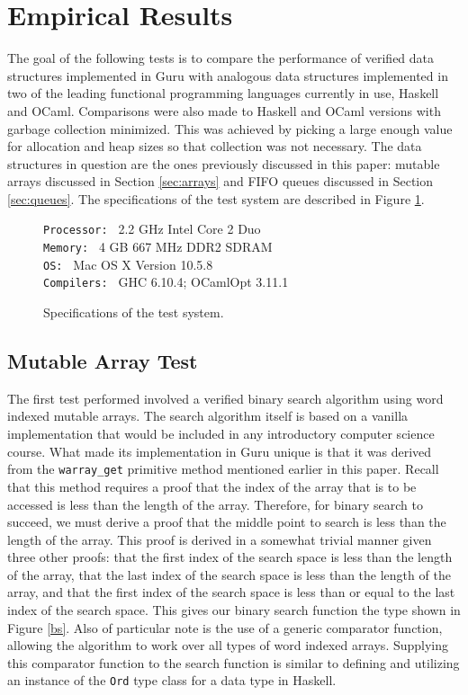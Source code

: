 \documentclass[9pt,natbib]{sigplanconf}
\begin{document}
\section{Empirical Results}
\label{sec:emp}

The goal of the following tests is to compare the performance of verified data structures implemented in Guru with analogous data structures implemented in two of the leading functional programming languages currently in use, Haskell and OCaml.  Comparisons were also made to Haskell and OCaml versions with garbage collection minimized.  This was achieved by picking a large enough value for allocation and heap sizes so that collection was not necessary.  The data structures in question are the ones previously discussed in this paper: mutable arrays discussed in Section \ref{sec:arrays} and FIFO queues discussed in Section \ref{sec:queues}.  The specifications of the test system are described in Figure \ref{teststats}.


\begin{figure}
\texttt{Processor: } 2.2 GHz Intel Core 2 Duo \\
\texttt{Memory: } 4 GB 667 MHz DDR2 SDRAM \\
\texttt{OS: } Mac OS X Version 10.5.8 \\
\texttt{Compilers: } GHC 6.10.4; OCamlOpt 3.11.1 
\caption{Specifications of the test system.}
\label{teststats}
\end{figure}

\subsection{Mutable Array Test}

The first test performed involved a verified binary search algorithm using word indexed mutable arrays.  The search algorithm itself is based on a vanilla implementation that would be included in any introductory computer science course.  What made its implementation in Guru unique is that it was derived from the \texttt{warray\_get} primitive method mentioned earlier in this paper.  Recall that this method requires a proof that the index of the array that is to be accessed is less than the length of the array.  Therefore, for binary search to succeed, we must derive a proof that the middle point to search is less than the length of the array.  This proof is derived in a somewhat trivial manner given three other proofs:  that the first index of the search space is less than the length of the array, that the last index of the search space is less than the length of the array, and that the first index of the search space is less than or equal to the last index of the search space.  This gives our binary search function the type shown in Figure \ref{bs}.  Also of particular note is the use of a generic comparator function, allowing the algorithm to work over all types of word indexed arrays.  Supplying this comparator function to the search function is similar to defining and utilizing an instance of the \texttt{Ord} type class for a data type in Haskell.
\end{document}
